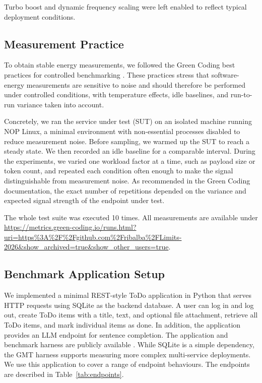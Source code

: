 \documentclass[sigconf]{acmart}
\begin{document}
Turbo boost and dynamic frequency scaling were left enabled to reflect typical deployment conditions.
\subsection{Measurement Practice}
To obtain stable energy measurements, we followed the Green Coding best practices for controlled benchmarking \cite{greencoding_bestpractices}. These practices stress that software-energy measurements are sensitive to noise and should therefore be performed under controlled conditions, with temperature effects, idle baselines, and run-to-run variance taken into account.

Concretely, we ran the service under test (SUT) on an isolated machine running NOP Linux, a minimal environment with non-essential processes disabled to reduce measurement noise. Before sampling, we warmed up the SUT to reach a steady state. We then recorded an idle baseline for a comparable interval. During the experiments, we varied one workload factor at a time, such as payload size or token count, and repeated each condition often enough to make the signal distinguishable from measurement noise. As recommended in the Green Coding documentation, the exact number of repetitions depended on the variance and expected signal strength of the endpoint under test.

The whole test suite was executed 10 times. All measurements are available under \url{https://metrics.green-coding.io/runs.html?uri=https%3A%2F%2Fgithub.com%2Fribalba%2FLimits-2026&show_archived=true&show_other_users=true}.

\subsection{Benchmark Application Setup}
We implemented a minimal REST-style ToDo application in Python that serves HTTP
requests using SQLite as the backend database. A user can log in and log out,
create ToDo items with a title, text, and optional file attachment, retrieve
all ToDo items, and mark individual items as done. In addition, the application
provides an LLM endpoint for sentence completion. The application and benchmark
harness are publicly available \cite{easytodo}. While SQLite is a simple
dependency, the GMT harness supports measuring more complex multi-service
deployments. We use this application to cover a range of endpoint behaviours.
The endpoints are described in Table~\ref{tab:endpoints}.
\end{document}

